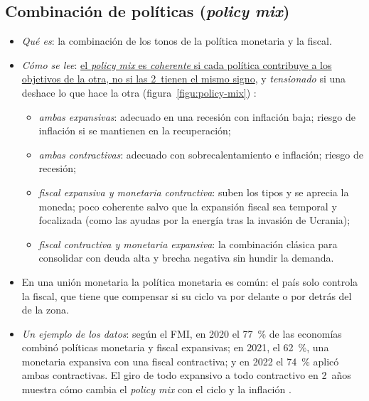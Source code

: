 \documentclass[11pt]{article}
\begin{document}
\subsection{Combinación de políticas (\emph{policy mix})}\label{sec:policy-mix}

\begin{itemize}
\item \emph{Qué es}: la combinación de los tonos de la política monetaria y la fiscal.
\item \emph{Cómo se lee}: \uline{el \emph{policy mix} es \emph{coherente} si cada política contribuye a los objetivos de la otra, no si las 2~tienen el mismo signo}, y \emph{tensionado} si una deshace lo que hace la otra (figura~\ref{figu:policy-mix}) :
  \begin{itemize}
  \item \emph{ambas expansivas}: adecuado en una recesión con inflación baja; riesgo de inflación si se mantienen en la recuperación;
  \item \emph{ambas contractivas}: adecuado con sobrecalentamiento e inflación; riesgo de recesión;
  \item \emph{fiscal expansiva y monetaria contractiva}: suben los tipos y se aprecia la moneda; poco coherente salvo que la expansión fiscal sea temporal y focalizada (como las ayudas por la energía tras la invasión de Ucrania);
  \item \emph{fiscal contractiva y monetaria expansiva}: la combinación clásica para consolidar con deuda alta y brecha negativa sin hundir la demanda.
  \end{itemize}
\item En una unión monetaria la política monetaria es común: el país solo controla la fiscal, que tiene que compensar si su ciclo va por delante o por detrás del de la zona.
\item \emph{Un ejemplo de los datos}: según el FMI, en 2020 el 77~\% de las economías combinó políticas monetaria y fiscal expansivas; en 2021, el 62~\%, una monetaria expansiva con una fiscal contractiva; y en 2022 el 74~\% aplicó ambas contractivas. El giro de todo expansivo a todo contractivo en 2~años muestra cómo cambia el \emph{policy mix} con el ciclo y la inflación \parencite{FMI2023FiscalMonitor}.
\end{itemize}

\begin{infografia}[!htb]
\centering
\caption{Los 4~cuadrantes del \emph{policy mix}}\label{figu:policy-mix}
\end{infografia}
\end{document}
